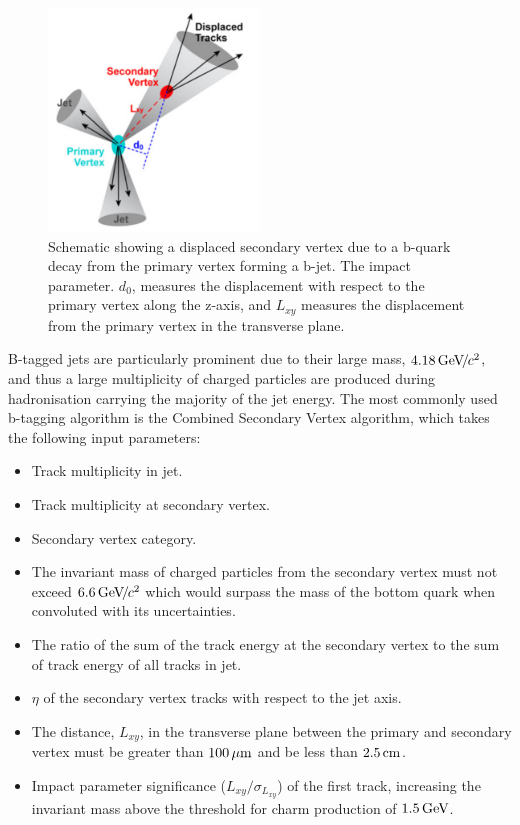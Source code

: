 \begin{figure} 
\begin{center}
\includegraphics[width=0.5\textwidth]{Figures/CSV.png}
\end{center}
\caption{Schematic showing a displaced secondary vertex due to a b-quark decay from the primary vertex forming a b-jet. The impact parameter. $d_0$, measures the displacement with respect to the primary vertex along the z-axis, and $L_{xy}$ measures the displacement from the primary vertex in the transverse plane.}
\label{fig-CSV}
\end{figure}

B-tagged jets are particularly prominent due to their large mass, $4.18 {\,\text{Ge\hspace{-.08em}V\hspace{-0.16em}/\hspace{-0.08em}}c^\text{2}}$, and thus a large multiplicity of charged particles are produced during hadronisation carrying the majority of the jet energy. The most commonly used b-tagging algorithm is the Combined Secondary Vertex \cite{CSV} algorithm, which takes the following input parameters:

\begin{itemize}
	\item Track multiplicity in jet.
	\item Track multiplicity at secondary vertex.
	\item Secondary vertex category.
	\item The invariant mass of charged particles from the secondary vertex must not exceed $6.6 {\,\text{Ge\hspace{-.08em}V\hspace{-0.16em}/\hspace{-0.08em}}c^\text{2}}$ which would surpass the mass of the bottom quark when convoluted with its uncertainties.
	\item The ratio of the sum of the track energy at the secondary vertex to the sum of track energy of all tracks in jet.
	\item $\eta$ of the secondary vertex tracks with respect to the jet axis.
	\item The distance, $L_{xy}$, in the transverse plane between the primary and secondary vertex must be greater than $100 \,\mu\text{m}$ and be less than $2.5 \,\text{cm}$.
	\item Impact parameter significance ($L_{xy}/\sigma_{L_{xy}}$) of the first track, increasing the invariant mass above the threshold for charm production of $1.5 \,\text{Ge\hspace{-.08em}V}$.  
\end{itemize}


